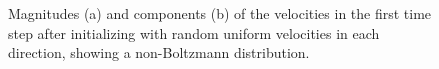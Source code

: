 \documentclass[reprint,floatfix,amsmath,amssymb,aps,pra]{revtex4-1}
\begin{document}
\begin{figure}
    \centering
     \label{fig:velocity-magnitudes-first}
     \label{fig:velocity-components-first}
    \caption{Magnitudes (a) and components (b) of the velocities in the first time step after initializing with random uniform velocities in each direction, showing a non-Boltzmann distribution.}
    \label{fig:velocity-evolution-first}
\end{figure}
\end{document}
